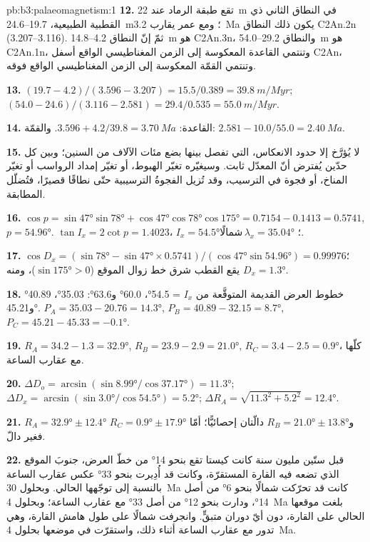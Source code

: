 \begin{solution}{pb:b3:palaeomagnetism:1}
\textbf{12.} تقع طبقة الرماد عند \qty{22}{m} في النطاق الثاني ذي القطبية الطبيعية،
19.7--\qty{24.6}{m}؛ ومع عمر يقارب \qty{3.2}{Ma} يكون ذلك النطاق C2An.2n
(3.207--3.116). ثمّ إنّ النطاق 4.2--\qty{14.8}{m} هو C2An.3n، والنطاق
29.2--\qty{54.0}{m} هو C2An.1n، وتنتمي القاعدة المعكوسة إلى الزمن المغناطيسي الواقع أسفل
C2An، وتنتمي القمّة المعكوسة إلى الزمن المغناطيسي الواقع فوقه.

\textbf{13.} $(19.7 - 4.2)/(3.596 - 3.207) = 15.5/0.389 = \qty{39.8}{m/Myr}$;
$(54.0 - 24.6)/(3.116 - 2.581) = 29.4/0.535 = \qty{55.0}{m/Myr}$.

\textbf{14.} القاعدة: $3.596 + 4.2/39.8 = \qty{3.70}{Ma}$. والقمّة: $2.581 -
10.0/55.0 = \qty{2.40}{Ma}$.

\textbf{15.} لا يُؤرَّخ إلا حدود الانعكاس، التي تفصل بينها بضع مئات الآلاف من السنين؛
وبين كل حدّين يُفترض أنّ المعدّل ثابت. وسيغيّره تغيّر الهبوط،
أو تغيّر إمداد الرواسب أو تغيّر المناخ، أو فجوة في الترسيب، وقد تُزيل الفجوةُ الترسيبية
حتّى نطاقًا قصيرًا، فتُضلّل المطابقة.

\textbf{16.} $\cos p = \sin\ang{47}\sin\ang{78} + \cos\ang{47}\cos\ang{78}
\cos\ang{175} = 0.7154 - 0.1413 = 0.5741$, $p = \ang{54.96}$. $\tan I_x =
2\cot p = 1.4023$، $I_x = \ang{54.5}$؛ $\lambda_x = \ang{35.04}$\,شمالًا.

\textbf{17.} $\cos D_x = (\sin\ang{78} - \sin\ang{47}\times0.5741)/
(\cos\ang{47}\sin\ang{54.96}) = 0.99976$؛ يقع القطب شرق
خط زوال الموقع ($\sin\ang{175} > 0$)، ومنه $D_x = \ang{1.3}$.

\textbf{18.} خطوط العرض القديمة المتوقَّعة من $I_x$ = \ang{54.5}، \ang{60.0}
و\ang{63.6}: \ang{35.03}، \ang{40.89} و\ang{45.21}. $P_A = 35.03 - 20.76 =
\ang{14.3}$, $P_B = 40.89 - 32.15 = \ang{8.7}$, $P_C = 45.21 - 45.33 =
\ang{-0.1}$.

\textbf{19.} $R_A = 34.2 - 1.3 = \ang{32.9}$, $R_B = 23.9 - 2.9 = \ang{21.0}$,
$R_C = 3.4 - 2.5 = \ang{0.9}$، كلّها مع عقارب الساعة.

\textbf{20.} $\Delta D_o = \arcsin(\sin\ang{8.99}/\cos\ang{37.17}) = \ang{11.3}$;
$\Delta D_x = \arcsin(\sin\ang{3.0}/\cos\ang{54.5}) = \ang{5.2}$; $\Delta R_A =
\sqrt{11.3^2 + 5.2^2} = \ang{12.4}$.

\textbf{21.} $R_A = \ang{32.9} \pm \ang{12.4}$ و$R_B = \ang{21.0} \pm
\ang{13.8}$ دالّتان إحصائيًّا؛ أمّا $R_C = \ang{0.9} \pm \ang{17.9}$ فغير دالّ.

\textbf{22.} قبل ستّين مليون سنة كانت كيستا تقع بنحو \ang{14} من خطّ العرض،
جنوبَ الموقع الذي تضعه فيه القارة المستقرّة، وكانت قد أُدِيرت بنحو \ang{33}
عكس عقارب الساعة بالنسبة إلى توجّهها الحالي. وبحلول \qty{30}{Ma} كانت قد تحرّكت شمالًا بنحو \ang{6}
من أصل \ang{14}، ودارت بنحو \ang{12} من أصل \ang{33}
مع عقارب الساعة؛ وبحلول \qty{4}{Ma} بلغت موقعها الحالي على القارة،
دون أيّ دوران متبقٍّ. وانجرفت شمالًا على طول هامش القارة، وهي تدور
مع عقارب الساعة أثناء ذلك، واستقرّت في موضعها بحلول \qty{4}{Ma}.


\end{solution}
